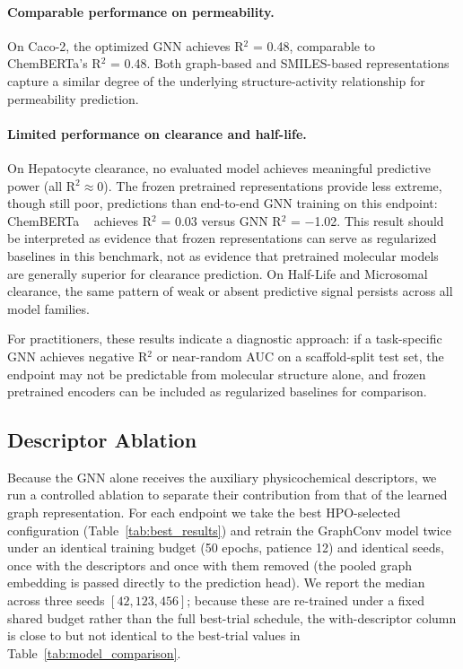 \documentclass[journal]{IEEEtran}
\begin{document}
\paragraph{Comparable performance on permeability.}
On Caco-2, the optimized GNN achieves R$^2$ = 0.48, comparable to ChemBERTa's R$^2$ = 0.48. Both graph-based and SMILES-based representations capture a similar degree of the underlying structure-activity relationship for permeability prediction.

\paragraph{Limited performance on clearance and half-life.}
On Hepatocyte clearance, no evaluated model achieves meaningful predictive power (all R$^2 \approx 0$). The frozen pretrained representations provide less extreme, though still poor, predictions than end-to-end GNN training on this endpoint: ChemBERTa ~\cite{chemberta2} achieves R$^2$ = 0.03 versus GNN R$^2$ = $-$1.02. This result should be interpreted as evidence that frozen representations can serve as regularized baselines in this benchmark, not as evidence that pretrained molecular models are generally superior for clearance prediction.  On Half-Life and Microsomal clearance, the same pattern of weak or absent predictive signal persists across all model families.

For practitioners, these results indicate a diagnostic approach: if a task-specific GNN achieves negative R$^2$ or near-random AUC on a scaffold-split test set, the endpoint may not be predictable from molecular structure alone, and frozen pretrained encoders can be included as regularized baselines for comparison.

\subsection{Descriptor Ablation}
\label{sec:descriptor_ablation}

Because the GNN alone receives the auxiliary physicochemical descriptors, we run a controlled ablation to separate their contribution from that of the learned graph representation. For each endpoint we take the best HPO-selected configuration (Table~\ref{tab:best_results}) and retrain the GraphConv model twice under an identical training budget (50 epochs, patience 12) and identical seeds, once with the descriptors and once with them removed (the pooled graph embedding is passed directly to the prediction head). We report the median across three seeds $[42, 123, 456]$; because these are re-trained under a fixed shared budget rather than the full best-trial schedule, the with-descriptor column is close to but not identical to the best-trial values in Table~\ref{tab:model_comparison}.
\end{document}
